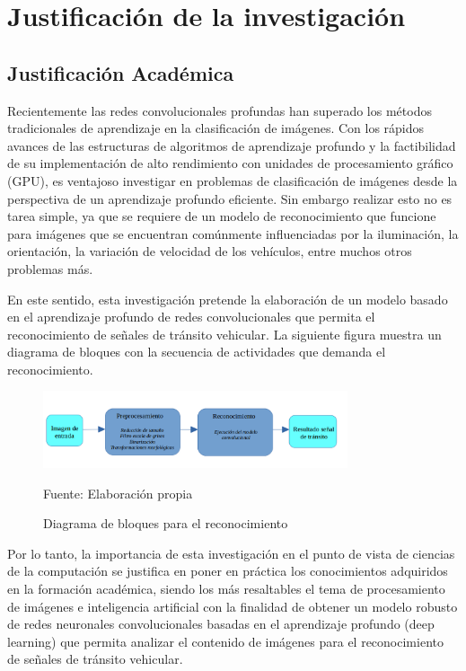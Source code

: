 	
\section{Justificación de la investigación} 

	\subsection{Justificación Académica}

	Recientemente las redes convolucionales profundas han superado los métodos tradicionales de aprendizaje en la clasificación de imágenes. Con los rápidos avances de las estructuras de algoritmos de aprendizaje profundo y la factibilidad de su implementación de alto rendimiento con unidades de procesamiento gráfico (GPU), es ventajoso investigar en problemas de clasificación de imágenes desde la perspectiva de un aprendizaje profundo eficiente. Sin embargo realizar esto no es tarea simple, ya que se requiere de un modelo de reconocimiento que funcione para imágenes que se encuentran comúnmente influenciadas por la iluminación, la orientación, la variación de velocidad de los vehículos, entre muchos otros problemas más.  \vskip 0.2cm

	En este sentido, esta investigación pretende la elaboración de un modelo basado en el aprendizaje profundo de redes convolucionales que permita el reconocimiento de señales de tránsito vehicular. La siguiente figura muestra un diagrama de bloques con la secuencia de actividades que demanda el reconocimiento.

	\begin{figure}[H]
	\begin{center}
	\includegraphics[width=0.8\textwidth]{images/intro/bloque}
	\end{center}
	\begin{center}
	\caption{\small{Diagrama de bloques para el reconocimiento}}
	{\small{Fuente: Elaboración propia}}
	\end{center}
	\vspace{-1.5em}
	\end{figure}


	Por lo tanto, la importancia de esta investigación en el punto de vista de ciencias de la computación se justifica en poner en práctica los conocimientos adquiridos en la formación académica, siendo los más resaltables el tema de procesamiento de imágenes e inteligencia artificial con la finalidad de obtener un modelo robusto de redes neuronales convolucionales basadas en el aprendizaje profundo (deep learning) que permita analizar el contenido de imágenes para el reconocimiento de señales de tránsito vehicular. 


